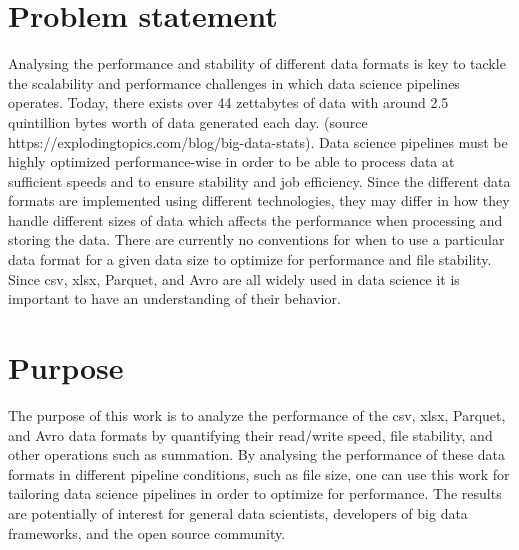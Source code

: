 \documentclass[12pt,twoside,english]{article}
\begin{document}
\section{Problem statement}
\label{sect:problem_statement}
Analysing the performance and stability of different data formats is key to tackle the scalability and performance challenges in which data science pipelines operates. Today, there exists over 44 zettabytes of data with around 2.5 quintillion bytes worth of data generated each day. (source https://explodingtopics.com/blog/big-data-stats). Data science pipelines must be highly optimized performance-wise in order to be able to process data at sufficient speeds and to ensure stability and job efficiency. Since the different data formats are implemented using different technologies, they may differ in how they handle different sizes of data which affects the performance when processing and storing the data. There are currently no conventions for when to use a particular data format for a given data size to optimize for performance and file stability. Since csv, xlsx, Parquet, and Avro are all widely used in data science it is important to have an understanding of their behavior.  

\begin{comment}
This project will benchmark 3 (or 4 if time permits) different text data formats commonly used in the field of Data Science, using open licensed data of different sizes (smaller than 1 MB, between 1 MB and 100 MB, bigger than 500 MB). We will then evaluate their performance according to the 3 different benchmarking metrics (file stability, read/write speed, and finally simple operation such sum items). The benchmark will be performed using Python; for this project, we will focus on just one language instead of all the other possible languages; the reason for this is because Python is one of the most used programming languages in Data Science.
\end{comment}

\section{Purpose}
\label{sect:purpose}
The purpose of this work is to analyze the performance of the csv, xlsx, Parquet, and Avro data formats by quantifying their read/write speed, file stability, and other operations such as summation. By analysing the performance of these data formats in different pipeline conditions, such as file size, one can use this work for tailoring data science pipelines in order to optimize for performance. The results are potentially of interest for general data scientists, developers of big data frameworks, and the open source community.
\end{document}
